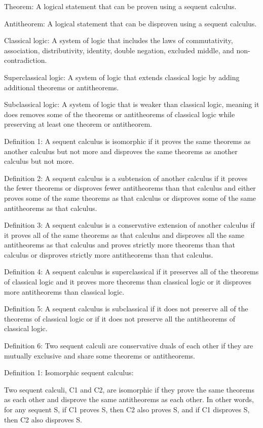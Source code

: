 \documentclass{article}
\begin{document}
Theorem: A logical statement that can be proven using a sequent calculus.

Antitheorem: A logical statement that can be disproven using a sequent calculus.

Classical logic: A system of logic that includes the laws of commutativity, association, distributivity, identity, double negation, excluded middle, and non-contradiction.

Superclassical logic: A system of logic that extends classical logic by adding additional theorems or antitheorems.

Subclassical logic: A system of logic that is weaker than classical logic, meaning it does removes some of the theorems or antitheorems of classical logic while preserving at least one theorem or antitheorem.

Definition 1: A sequent calculus is isomorphic if it proves the same theorems as another calculus but not more and disproves the same theorems as another calculus but not more.

Definition 2: A sequent calculus is a subtension of another calculus if it proves the fewer theorems or disproves fewer antitheorems than that calculus and either proves some of the same theorems as that calculus or disproves some of the same antitheorems as that calculus.

Definition 3: A sequent calculus is a conservative extension of another calculus if it proves all of the same theorems as that calculus and disproves all the same antitheorems as that calculus and proves strictly more theorems than that calculus or disproves strictly more antitheorems than that calculus.

Definition 4: A sequent calculus is superclassical if it preserves all of the theorems of classical logic and it proves more theorems than classical logic or it disproves more antitheorems than classical logic.

Definition 5: A sequent calculus is subclassical if it does not preserve all of the theorems of classical logic or if it does not preserve all the antitheorems of classical logic.

Definition 6: Two sequent calculi are conservative duals of each other if they are mutually exclusive and share some theorems or antitheorems.

Definition 1: Isomorphic sequent calculus:

Two sequent calculi, C1 and C2, are isomorphic if they prove the same theorems as each other and disprove the same antitheorems as each other. In other words, for any sequent S, if C1 proves S, then C2 also proves S, and if C1 disproves S, then C2 also disproves S.
\end{document}

